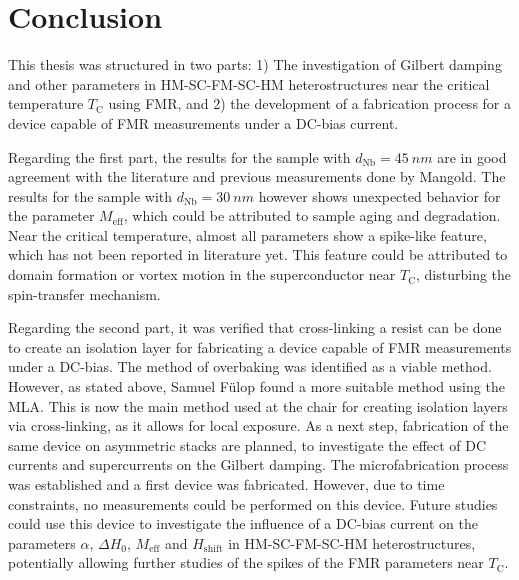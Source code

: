 \chapter{Conclusion}
This thesis was structured in two parts: 1) The investigation of Gilbert damping and other parameters in HM-SC-FM-SC-HM heterostructures near the critical temperature $T_\textrm{C}$ using FMR, and 2) the development of a fabrication process for a device capable of FMR measurements under a DC-bias current.

Regarding the first part, the results for the sample with $d_\textrm{Nb} = \SI{45}{nm}$ are in good agreement with the literature \cite{Jeon2019} and previous measurements done by Mangold.
The results for the sample with $d_\textrm{Nb} = \SI{30}{nm}$ however shows unexpected behavior for the parameter $M_\textrm{eff}$, which could be attributed to sample aging and degradation. Near the critical temperature, almost all parameters show a spike-like feature, which has not been reported in literature yet. This feature could be attributed to domain formation or vortex motion in the superconductor near $T_\textrm{C}$, disturbing the spin-transfer mechanism.

Regarding the second part, it was verified that cross-linking a resist can be done to create an isolation layer for fabricating a device capable of FMR measurements under a DC-bias. The method of overbaking was identified as a viable method. However, as stated above, Samuel Fülop found a more suitable method using the MLA. This is now the main method used at the chair for creating isolation layers via cross-linking, as it allows for local exposure.
As a next step, fabrication of the same device on asymmetric stacks are planned, to investigate the effect of DC currents and supercurrents on the Gilbert damping.
The microfabrication process was established and a first device was fabricated. However, due to time constraints, no measurements could be performed on this device. Future studies could use this device to investigate the influence of a DC-bias current on the parameters $\alpha$, $\Delta H_0$, $M_\textrm{eff}$ and $H_\textrm{shift}$ in HM-SC-FM-SC-HM heterostructures, potentially allowing further studies of the spikes of the FMR parameters near $T_\textrm{C}$.